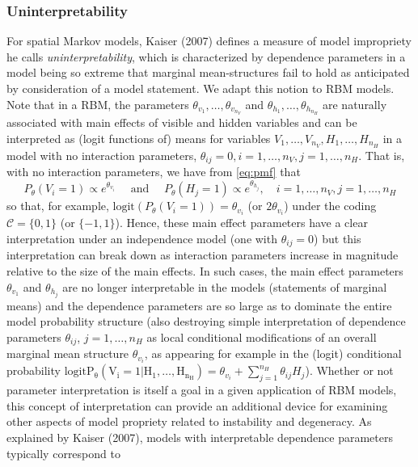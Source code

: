 \documentclass[AMS,STIX1COL]{WileyNJD-v2}
\newcommand{\nv}{{n_{\scriptscriptstyle V}}}
\newcommand{\nh}{{n_{\scriptscriptstyle H}}}
\begin{document}
\hypertarget{uninterpretability}{%
\subsubsection{Uninterpretability}\label{uninterpretability}}

For spatial Markov models, Kaiser (2007) defines a measure of model
impropriety he calls \emph{uninterpretability}, which is characterized
by dependence parameters in a model being so extreme that marginal
mean-structures fail to hold as anticipated by consideration of a model
statement. We adapt this notion to RBM models. Note that in a RBM, the
parameters \(\theta_{v_1}, \dots, \theta_{v_\nv}\) and
\(\theta_{h_1}, \dots, \theta_{h_\nh}\) are naturally associated with
main effects of visible and hidden variables and can be interpreted as
(logit functions of) means for variables
\(V_1, \dots, V_\nv, H_1, \dots, H_\nh\) in a model with no interaction
parameters, \(\theta_{ij} = 0, i = 1, \dots, \nv, j = 1, \dots, \nh\).
That is, with no interaction parameters, we have from \eqref{eq:pmf}
that \[
P_\theta(V_i=1) \propto e^{\theta_{v_i}} \quad \text{ and } \quad P_\theta(H_j=1) \propto e^{\theta_{h_j}}, \quad  i=1,\ldots,\nv,j=1,\ldots,\nh
\] so that, for example, \(\text{logit}(P_\theta(V_i=1))=\theta_{v_i}\)
(or \(2 \theta_{v_i}\)) under the coding \(\mathcal{C}=\{0,1\}\) (or
\(\{-1,1\}\)). Hence, these main effect parameters have a clear
interpretation under an independence model (one with
\(\theta_{ij} = 0\)) but this interpretation can break down as
interaction parameters increase in magnitude relative to the size of the
main effects. In such cases, the main effect parameters \(\theta_{v_1}\)
and \(\theta_{h_j}\) are no longer interpretable in the models
(statements of marginal means) and the dependence parameters are so
large as to dominate the entire model probability structure (also
destroying simple interpretation of dependence parameters
\(\theta_{ij}\), \(j=1,\ldots,\nh\) as local conditional modifications
of an overall marginal mean structure \(\theta_{v_i}\), as appearing for
example in the (logit) conditional probability
\(\mathrm{logit P_\theta(V_i=1|H_1,\ldots,H_{\nh})}= \theta_{v_i} + \sum_{j=1}^{\nh} \theta_{ij} H_j\)).
Whether or not parameter interpretation is itself a goal in a given
application of RBM models, this concept of interpretation can provide an
additional device for examining other aspects of model propriety related
to instability and degeneracy. As explained by Kaiser (2007), models
with interpretable dependence parameters typically correspond to
\end{document}
